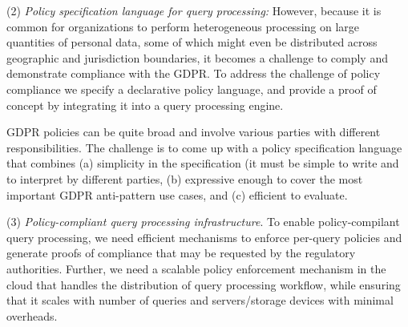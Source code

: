 



(2) \textit{Policy specification language for query processing:} However, because it is common for organizations to perform heterogeneous processing on large quantities of personal data, some of which might even be distributed across geographic and jurisdiction boundaries, it becomes a challenge to comply and demonstrate compliance with the GDPR.
To address the challenge of policy compliance we specify a declarative policy language, and provide a proof of concept by integrating it into a query processing engine.



GDPR policies can be quite broad and involve various parties with different responsibilities. The challenge is to come up with a policy specification language that combines (a) simplicity in the specification (it must be simple to write and to interpret by different parties, (b) expressive enough to cover the most important GDPR anti-pattern use cases, and (c) efficient to evaluate. 


(3) \textit{Policy-compliant query processing infrastructure}. To enable policy-compilant query processing, we need efficient mechanisms to enforce per-query policies and generate proofs of compliance that may be requested by the regulatory authorities. Further,  we need a scalable policy enforcement mechanism in the cloud that handles the distribution of query processing workflow, while ensuring that it scales with number of queries and servers/storage devices with minimal overheads.

